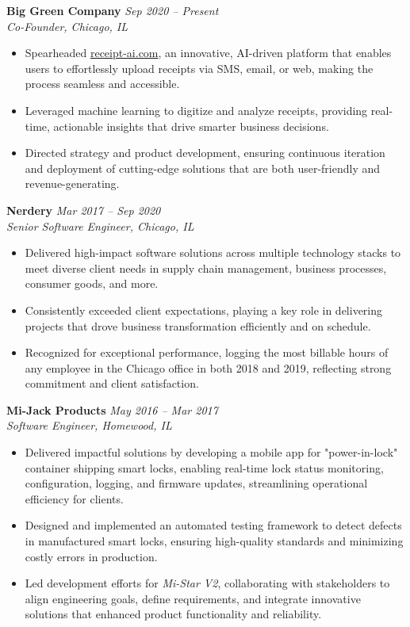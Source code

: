 \documentclass[letterpaper,10pt]{article}
\begin{document}
\textbf{Big Green Company} \hfill \textit{Sep 2020 -- Present}\\
\emph{Co-Founder, Chicago, IL}\\
\begin{itemize}
    \item Spearheaded \href{https://receipt-ai.com}{receipt-ai.com}, an innovative, 
          AI-driven platform that enables users to effortlessly upload receipts via SMS, 
          email, or web, making the process seamless and accessible.
    \item Leveraged machine learning to digitize and analyze receipts, providing 
          real-time, actionable insights that drive smarter business decisions.
    \item Directed strategy and product development, ensuring continuous iteration and 
          deployment of cutting-edge solutions that are both user-friendly and revenue-generating.
\end{itemize}

\textbf{Nerdery} \hfill \textit{Mar 2017 -- Sep 2020}\\
\emph{Senior Software Engineer, Chicago, IL}\\
\begin{itemize}
  \item Delivered high-impact software solutions across multiple technology stacks to 
        meet diverse client needs in supply chain management, business processes, 
        consumer goods, and more.
  \item Consistently exceeded client expectations, playing a key role in delivering 
        projects that drove business transformation efficiently and on schedule.
  \item Recognized for exceptional performance, logging the most billable hours of 
        any employee in the Chicago office in both 2018 and 2019, reflecting strong 
        commitment and client satisfaction.
\end{itemize}

\textbf{Mi-Jack Products} \hfill \textit{May 2016 -- Mar 2017}\\
\emph{Software Engineer, Homewood, IL}\\
\begin{itemize}
  \item Delivered impactful solutions by developing a mobile app for "power-in-lock" 
        container shipping smart locks, enabling real-time lock status monitoring, 
        configuration, logging, and firmware updates, streamlining operational efficiency 
        for clients.
  \item Designed and implemented an automated testing framework to detect defects in 
        manufactured smart locks, ensuring high-quality standards and minimizing costly 
        errors in production.
  \item Led development efforts for \emph{Mi-Star V2}, collaborating with stakeholders to 
        align engineering goals, define requirements, and integrate innovative solutions 
        that enhanced product functionality and reliability.
\end{itemize}
\end{document}
